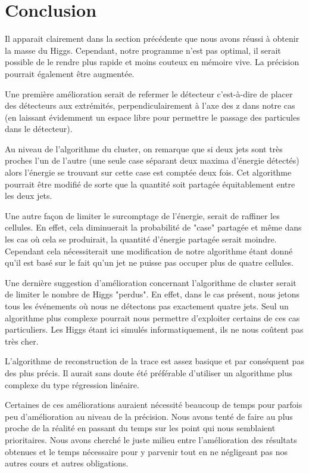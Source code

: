 \documentclass[11pt]{article}
\begin{document}
\newpage
\section{Conclusion}
 Il apparait clairement dans la section pr\'ec\'edente que nous avons r\'eussi \`a obtenir la masse du Higgs.
Cependant, notre programme n'est pas optimal, il serait possible de le rendre plus rapide et 
moins couteux en m\'emoire vive. La pr\'ecision pourrait \'egalement être augment\'ee. 

Une première amélioration serait de refermer le d\'etecteur c'est-à-dire de placer des d\'etecteurs aux extrémités, 
perpendiculairement à l'axe des z dans notre cas (en laissant évidemment un
espace libre pour permettre le passage des 
particules dans le d\'etecteur). 

Au niveau de l'algorithme du cluster, on remarque que si deux jets sont très proches l'un de l'autre (une seule case 
s\'eparant deux maxima d'énergie détectés) alors l'énergie se trouvant sur cette
case est comptée deux fois. Cet algorithme
 pourrait être modifié de sorte que la quantité soit partagée équitablement
entre les deux jets.

Une autre façon de limiter le surcomptage de l'énergie, serait de raffiner les 
cellules. En effet, cela diminuerait la probabilité de "case" partagée et même dans les cas où cela se produirait, la
quantité d'énergie partagée serait moindre. Cependant cela nécessiterait une modification de notre 
algorithme 
étant donné qu'il est basé sur le fait qu'un jet ne puisse pas occuper
plus de quatre cellules.

Une dernière suggestion d'amélioration concernant l'algorithme de cluster serait
de limiter le nombre
de Higgs "perdus". En effet, dans le cas présent, nous jetons tous les
événements où nous ne détectons pas exactement quatre jets. Seul un algorithme
plus complexe pourrait nous permettre d'exploiter certains de ces cas
particuliers. Les Higgs étant ici simulés informatiquement, ils ne nous coûtent
pas très cher.

L'algorithme de reconstruction de la trace est assez basique et par conséquent
pas des plus précis. Il aurait sans doute
été préférable d'utiliser un algorithme plus complexe du type régression linéaire.


Certaines de ces améliorations auraient nécessité beaucoup de temps 
pour parfois peu d'amélioration au niveau de la précision. Nous avons tenté de
faire au plus proche de la réalité en passant du temps sur les point qui nous
semblaient prioritaires. Nous avons cherché le juste milieu entre l'amélioration
des résultats obtenues et le temps nécessaire pour y parvenir tout en ne
négligeant
pas nos autres cours et autres obligations.


		
\end{document}
